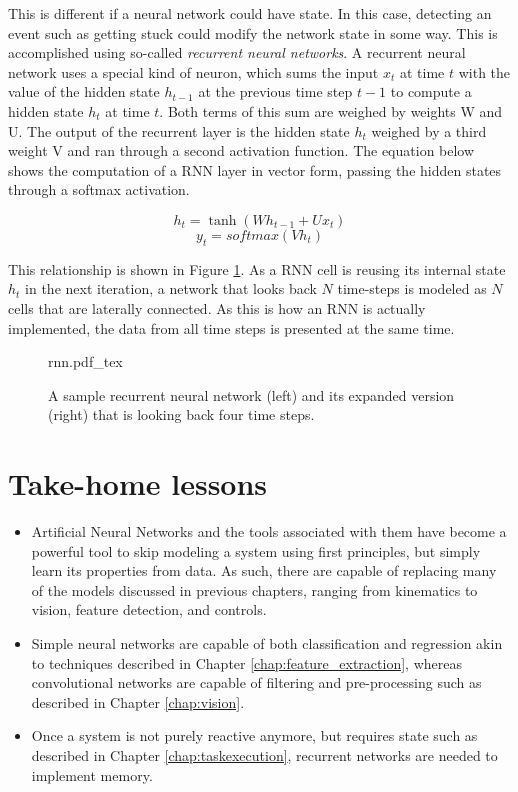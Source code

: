 This is different if a neural network could have state. In this case, detecting an event such as getting stuck could modify the network state in some way. This is accomplished using so-called \emph{recurrent neural networks}. A recurrent neural network uses a special kind of neuron, which sums the input $x_t$ at time $t$ with the value of the hidden state $h_{t-1}$ at the previous time step $t-1$ to compute a hidden state $h_t$ at time $t$. Both terms of this sum are weighed by weights W and U. The output of the recurrent layer is the hidden state $h_t$ weighed by a third weight V and ran through a second activation function. The equation below shows the computation of a RNN layer in vector form, passing the hidden states through a softmax activation.

\begin{equation}
h_t = \tanh(Wh_{t-1}+Ux_t)
\end{equation}
\begin{equation}
y_t = softmax(Vh_t)
\end{equation}

This relationship is shown in Figure \ref{fig:rnn}. As a RNN cell is reusing its internal state $h_t$ in the next iteration, a network that looks back $N$ time-steps is modeled as $N$ cells that are laterally connected. As this is how an RNN is actually implemented, the data from all time steps is presented at the same time.  

\begin{figure}[htb]
\tiny
    \centering
    \def\svgwidth{\textwidth}
    {rnn.pdf_tex}
    \caption{A sample recurrent neural network (left) and its expanded version (right) that is looking back four time steps. \label{fig:rnn}}
\end{figure}

\section*{Take-home lessons}
\begin{itemize}
\item Artificial Neural Networks and the tools associated with them have become a powerful tool to skip modeling a system using first principles, but simply learn its properties from data. As such, there are capable of replacing many of the models discussed in previous chapters, ranging from kinematics to vision, feature detection, and controls.
\item Simple neural networks are capable of both classification and regression akin to techniques described in Chapter \ref{chap:feature_extraction}, whereas convolutional networks are capable of filtering and pre-processing such as described in Chapter \ref{chap:vision}.
\item Once a system is not purely reactive anymore, but requires state such as described in Chapter \ref{chap:taskexecution}, recurrent networks are needed to implement memory. 
\end{itemize}

